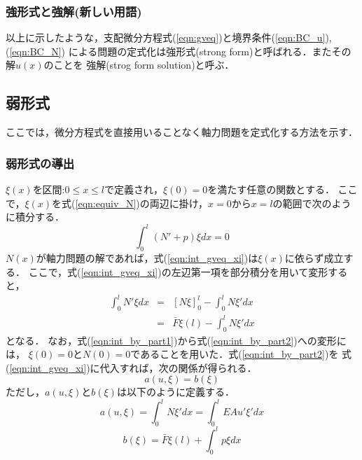 \documentclass[10pt,a4j]{jarticle}
\begin{document}
\subsubsection{強形式と強解(新しい用語)}
以上に示したような，支配微分方程式(\ref{eqn:gveq})と境界条件(\ref{eqn:BC_u}),(\ref{eqn:BC_N})
による問題の定式化は強形式(strong form)と呼ばれる．またその解$u(x)$のことを
強解(strog form solution)と呼ぶ．
\subsection{弱形式}
ここでは，微分方程式を直接用いることなく軸力問題を定式化する方法を示す．
\subsubsection{弱形式の導出}
$\xi (x)$を区間:$0\leq x \leq l$で定義され，$\xi(0)=0$を満たす任意の関数とする．
ここで，$\xi (x)$を式(\ref{eqn:equiv_N})の両辺に掛け，$x=0$から$x=l$の範囲で次のように積分する．
\begin{equation}
	\int _0^l 
	\left(N'+p \right) \xi dx =0
	\label{eqn:int_gveq_xi}
\end{equation}
$N(x)$が軸力問題の解であれば，式(\ref{eqn:int_gveq_xi})は$\xi(x)$に依らず成立する．
ここで，式(\ref{eqn:int_gveq_xi})の左辺第一項を部分積分を用いて変形すると，
\begin{eqnarray}
	\int _0^l N'\xi dx &= & \left[ N\xi \right]_0^l -\int_0^l N \xi'dx  
	\label{eqn:int_by_part1}
	\\
	&= & \bar F \xi(l)  -\int_0^l N \xi'dx  
	\label{eqn:int_by_part2}
\end{eqnarray}
となる．
なお，式(\ref{eqn:int_by_part1})から式(\ref{eqn:int_by_part2})への変形には，
$\xi(0)=0$と$N(0)=0$であることを用いた．式(\ref{eqn:int_by_part2})を
式(\ref{eqn:int_gveq_xi})に代入すれば，次の関係が得られる．
\begin{equation}
	a(u,\xi)=b(\xi)
	\label{eqn:WF_N}
\end{equation}
ただし，$a(u,\xi)$と$b(\xi)$は以下のように定義する．
\begin{equation}
	a(u,\xi) = \int_0^l N \xi'dx  
	= \int_0^l EA u' \xi'dx  
	\label{eqn:blinf_N}
\end{equation}
\begin{equation}
	b(\xi)= \bar F \xi (l) + 
	\int_0^l p\xi dx 
	\label{eqn:linf_N}
\end{equation}
\end{document}
